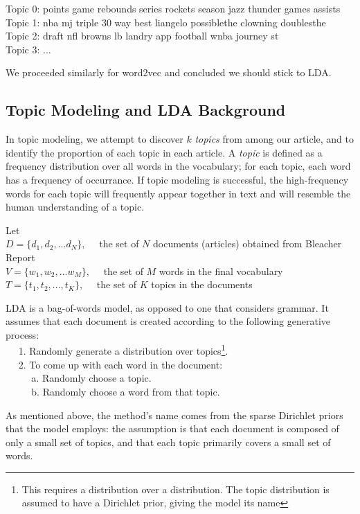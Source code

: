 \documentclass[11pt]{article}
\begin{document}
\begin{ttfamily}
 Topic 0: points game rebounds series rockets season jazz thunder games assists\\
Topic 1: nba mj triple 30 way best liangelo possiblethe clowning doublesthe\\
Topic 2: draft nfl browns lb landry app football wnba journey st\\
Topic 3: ...
\end{ttfamily}

We proceeded similarly for word2vec and concluded we should stick to LDA.

\subsection{Topic Modeling and LDA Background}
In topic modeling, we attempt to discover $k$ \textit{topics} from among our article, and to identify the proportion of each topic in each article.  A \textit{topic} is defined as a frequency distribution over all words in the vocabulary; for each topic, each word has a frequency of occurrance.  If topic modeling is successful, the high-frequency words for each topic will frequently appear together in text and will resemble the human understanding of a topic. 

Let \\
$D = \{d_1, d_2, ... d_N \}, \quad$ the set of $N$ documents (articles) obtained from Bleacher Report \\
$V = \{w_1, w_2, ... w_M \}, \quad$ the set of $M$ words in the final vocabulary \\
$T = \{t_1, t_2, ..., t_K\}, \quad$ the set of $K$ topics in the documents 

LDA is a bag-of-words model, as opposed to one that considers grammar.  It assumes that each document is created according to the following generative process: \\
$\text{} \quad$ 1. Randomly generate a distribution over topics\footnote{This requires a distribution over a distribution. The  topic distribution is assumed to have a Dirichlet prior, giving the model its name}. \\
$\text{} \quad$ 2. To come up with each word in the document: \\
$\text{} \quad$ $\quad$ a. Randomly choose a topic. \\
$\text{} \quad$ $\quad$ b. Randomly choose a word from that topic. 

As mentioned above, the method's name comes from the sparse Dirichlet priors that the model employs: the assumption is that each document is composed of only a small set of topics, and that each topic primarily covers a small set of words.
\end{document}
